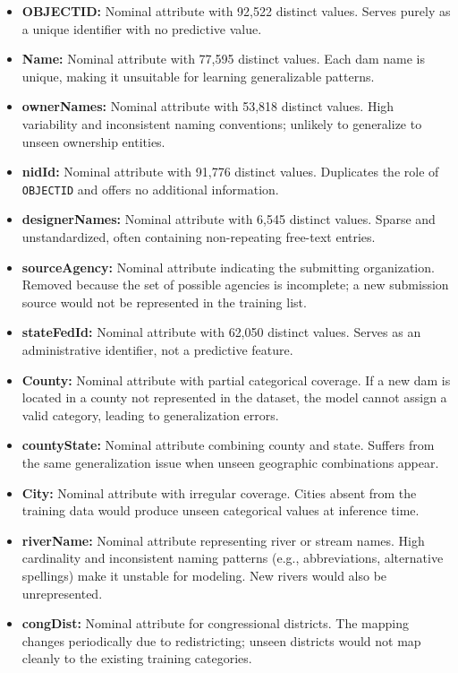 \documentclass{article}
\begin{document}
\begin{itemize}
    \item \textbf{OBJECTID:} Nominal attribute with 92,522 distinct values. Serves purely as a unique identifier with no predictive value.
    \item \textbf{Name:} Nominal attribute with 77,595 distinct values. Each dam name is unique, making it unsuitable for learning generalizable patterns.
    \item \textbf{ownerNames:} Nominal attribute with 53,818 distinct values. High variability and inconsistent naming conventions; unlikely to generalize to unseen ownership entities.
    \item \textbf{nidId:} Nominal attribute with 91,776 distinct values. Duplicates the role of \texttt{OBJECTID} and offers no additional information.
    \item \textbf{designerNames:} Nominal attribute with 6,545 distinct values. Sparse and unstandardized, often containing non-repeating free-text entries.
    \item \textbf{sourceAgency:} Nominal attribute indicating the submitting organization. Removed because the set of possible agencies is incomplete; a new submission source would not be represented in the training list.
    \item \textbf{stateFedId:} Nominal attribute with 62,050 distinct values. Serves as an administrative identifier, not a predictive feature.
    \item \textbf{County:} Nominal attribute with partial categorical coverage. If a new dam is located in a county not represented in the dataset, the model cannot assign a valid category, leading to generalization errors.
    \item \textbf{countyState:} Nominal attribute combining county and state. Suffers from the same generalization issue when unseen geographic combinations appear.
    \item \textbf{City:} Nominal attribute with irregular coverage. Cities absent from the training data would produce unseen categorical values at inference time.
    \item \textbf{riverName:} Nominal attribute representing river or stream names. High cardinality and inconsistent naming patterns (e.g., abbreviations, alternative spellings) make it unstable for modeling. New rivers would also be unrepresented.
    \item \textbf{congDist:} Nominal attribute for congressional districts. The mapping changes periodically due to redistricting; unseen districts would not map cleanly to the existing training categories.

\end{itemize}
\end{document}
